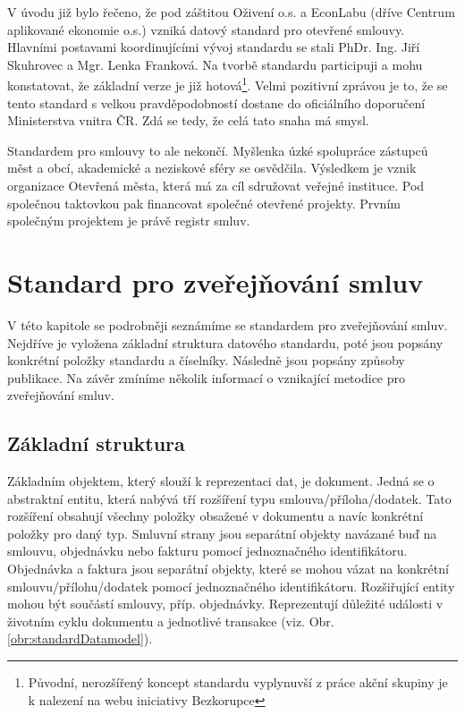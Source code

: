 V úvodu již bylo řečeno, že pod záštitou Oživení o.s.\cite{oz} a EconLabu\cite{econLab} (dříve Centrum aplikované ekonomie o.s.) vzniká datový standard pro otevřené smlouvy. Hlavními postavami koordinujícími vývoj standardu se stali PhDr. Ing. Jiří Skuhrovec a Mgr. Lenka Franková. Na tvorbě standardu participuji a mohu konstatovat, že základní verze je již hotová\footnote{Původní, nerozšířený koncept standardu vyplynuvší z práce akční skupiny je k nalezení na webu iniciativy Bezkorupce\cite{standard}}. Velmi pozitivní zprávou je to, že se tento standard s velkou pravděpodobností dostane do oficiálního doporučení Ministerstva vnitra ČR. Zdá se tedy, že celá tato snaha má smysl.

Standardem pro smlouvy to ale nekončí. Myšlenka úzké spolupráce zástupců měst a obcí, akademické a neziskové sféry se osvědčila. Výsledkem je vznik organizace Otevřená města\cite{otv}, která má za cíl sdružovat veřejné instituce. Pod společnou taktovkou pak financovat společné otevřené projekty. Prvním společným projektem je právě registr smluv. \cite{opendatapsi, opendatagovernment, opendatacr, odgov_s}

\section[Standard pro zveřejňování smluv]{Standard pro zveřejňování smluv\cite{metodika, standard}}

V této kapitole se podrobněji seznámíme se standardem pro zveřejňování smluv. Nejdříve je vyložena základní struktura datového standardu, poté jsou popsány konkrétní položky standardu a číselníky. Následně jsou popsány způsoby publikace. Na závěr zmíníme několik informací o vznikající metodice pro zveřejňování smluv. 

\subsection{Základní struktura}

Základním objektem, který slouží k reprezentaci dat, je dokument. Jedná se o abstraktní entitu, která nabývá tří rozšíření typu smlouva/příloha/dodatek. Tato rozšíření obsahují všechny položky obsažené v dokumentu a navíc konkrétní položky pro daný typ.
Smluvní strany jsou separátní objekty navázané buď na smlouvu, objednávku nebo fakturu pomocí jednoznačného identifikátoru.
Objednávka a faktura jsou separátní objekty, které se mohou vázat na konkrétní smlouvu/přílohu/dodatek pomocí jednoznačného identifikátoru.
Rozšiřující entity mohou být součástí smlouvy, příp. objednávky. Reprezentují důležité události v životním cyklu dokumentu a jednotlivé transakce (viz. Obr. \ref{obr:standardDatamodel}). 

